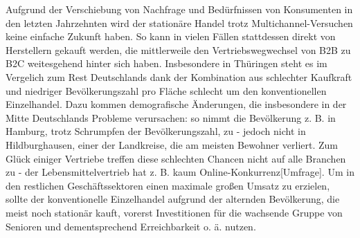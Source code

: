 



\begin{folding} %

Aufgrund der Verschiebung von Nachfrage und Bedürfnissen von Konsumenten in den letzten Jahrzehnten wird der stationäre Handel trotz Multichannel-Versuchen keine einfache Zukunft haben. So kann in vielen Fällen stattdessen direkt von Herstellern gekauft werden, die mittlerweile den Vertriebswegwechsel von \ac{B2B} zu \ac{B2C} weitesgehend hinter sich haben. 
Insbesondere in Thüringen steht es im Vergelich zum Rest Deutschlands dank der Kombination aus schlechter Kaufkraft und niedriger Bevölkerungszahl pro Fläche schlecht um den konventionellen Einzelhandel\cite[S. 29]{Nitt}. Dazu kommen demografische Änderungen, die insbesondere in der Mitte Deutschlands Probleme verursachen: so nimmt die Bevölkerung z. B. in Hamburg, trotz Schrumpfen der Bevölkerungszahl, zu - jedoch nicht in Hildburghausen, einer der Landkreise, die am meisten Bewohner verliert\cite[S. 32f]{Nitt}. 
Zum Glück einiger Vertriebe treffen diese schlechten Chancen nicht auf alle Branchen zu - der Lebensmittelvertrieb hat z. B. kaum Online-Konkurrenz[Umfrage]. Um in den restlichen Geschäftssektoren einen maximale großen Umsatz zu erzielen, sollte der konventionelle Einzelhandel aufgrund der alternden Bevölkerung, die meist noch stationär kauft, vorerst Investitionen für die wachsende Gruppe von Senioren und dementsprechend Erreichbarkeit o. ä. nutzen.

\end{folding}

